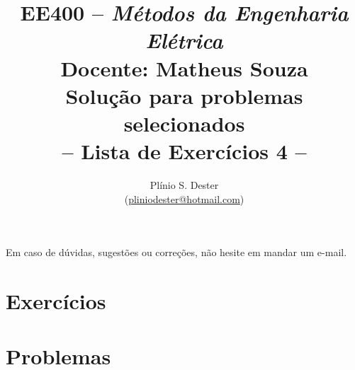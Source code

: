 \documentclass[answers, 12pt]{exam}
\title{	%
        EE400 -- \textit{Métodos da Engenharia Elétrica} \\[-0mm]
        {\Large Docente: Matheus Souza} \\[+1mm]
        {\Large Solução para problemas selecionados}\\[-0mm]
        -- Lista de Exercícios 4 --
}
\author{Plínio S. Dester\\ (\url{pliniodester@hotmail.com})}
\begin{document}
\maketitle

Em caso de dúvidas, sugestões ou correções, não hesite em mandar um e-mail.


\setcounter{section}{3}
\section{Exercícios}


\setcounter{section}{3}
\section{Problemas}


% 
\end{document}
